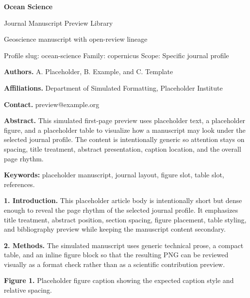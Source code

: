 \documentclass[10pt,a4paper]{article}
\begin{document}
\begin{flushleft}
{\LARGE\bfseries Ocean Science}\par
\vspace{0.25em}
{\small Journal Manuscript Preview Library}\par
\vspace{0.15em}
{\footnotesize Geoscience manuscript with open-review lineage}\par
\vspace{0.2em}
{\footnotesize Profile slug: ocean-science \quad Family: copernicus \quad Scope: Specific journal profile}
\end{flushleft}
\vspace{0.2em}



\noindent\textbf{Authors.} A. Placeholder, B. Example, and C. Template\par
\noindent\textbf{Affiliations.} Department of Simulated Formatting, Placeholder Institute\par
\noindent\textbf{Contact.} preview@example.org\par
\vspace{0.4em}
\noindent\textbf{Abstract.} This simulated first-page preview uses placeholder text, a placeholder figure, and a placeholder table to visualize how a manuscript may look under the selected journal profile. The content is intentionally generic so attention stays on spacing, title treatment, abstract presentation, caption location, and the overall page rhythm.\par\vspace{0.6em}
\noindent\textbf{Keywords:} placeholder manuscript, journal layout, figure slot, table slot, references.\par\vspace{0.6em}


\small
\textbf{1. Introduction.} This placeholder article body is intentionally short but dense enough to reveal the page rhythm of the selected journal profile. It emphasizes title treatment, abstract position, section spacing, figure placement, table styling, and bibliography preview while keeping the manuscript content secondary.

\textbf{2. Methods.} The simulated manuscript uses generic technical prose, a compact table, and an inline figure block so that the resulting PNG can be reviewed visually as a format check rather than as a scientific contribution preview.


\begin{center}\end{center}\noindent\textbf{Figure 1.} Placeholder figure caption showing the expected caption style and relative spacing.\par\vspace{0.5em}
\end{document}
